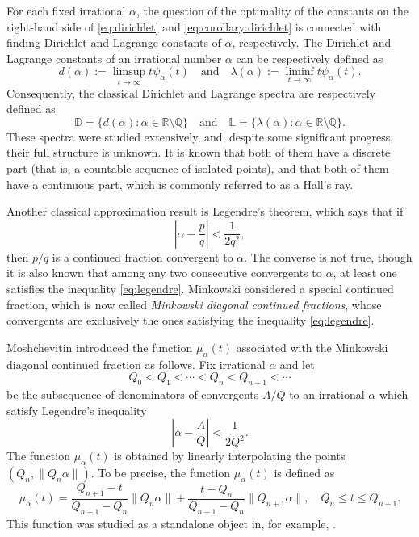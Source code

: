 \documentclass[11pt]{amsart}
\newcommand{\R}{\mathbb R}
\newcommand{\Q}{\mathbb Q}
\begin{document}
For each fixed irrational $\alpha$, the question of the optimality of the constants on the right-hand side of \eqref{eq:dirichlet} and \eqref{eq:corollary:dirichlet} is connected with finding Dirichlet and Lagrange constants of $\alpha$, respectively.  The Dirichlet and Lagrange constants of an irrational number $\alpha$ can be respectively defined as
$$
d(\alpha) := \limsup_{t\to\infty} t\psi_\alpha(t)
\quad \text{and} \quad
\lambda(\alpha) := \liminf_{t\to\infty} t\psi_\alpha(t).
$$
Consequently, the classical Dirichlet and Lagrange spectra are respectively defined as
$$
\mathbb{D}= \{ d(\alpha): \alpha\in\R\setminus\Q\}
\quad
\text{and}
\quad
\mathbb{L}= \{ \lambda(\alpha): \alpha\in\R\setminus\Q\}.
$$
These spectra were studied extensively, and, despite some significant progress, their full structure is unknown. It is known that both of them have a discrete part (that is, a countable sequence of isolated points), and that both of them have a continuous part, which is commonly referred to as a Hall's ray.



Another classical approximation result is Legendre's theorem, which says that if
\begin{equation}\label{eq:legendre}
\left| \alpha - \frac{p}{q} \right| < \frac{1}{2q^2},
\end{equation}
then $p/q$ is a continued fraction convergent to $\alpha$. The converse is not true, though it is also known that among any two consecutive convergents to $\alpha$, at least one satisfies the inequality \eqref{eq:legendre}. Minkowski \cite{MR1511108} considered a special continued fraction, which is now called {\it Minkowski diagonal continued fractions}, whose convergents are exclusively the ones satisfying the inequality \eqref{eq:legendre}.



Moshchevitin introduced the function $\mu_\alpha(t)$ associated with the
Minkowski diagonal continued fraction as follows. Fix irrational $\alpha$ and let 
\begin{equation}\label{sequence:conv}
Q_0<Q_1<\cdots<Q_{n}<Q_{n+1}<\cdots
\end{equation}
be the subsequence of denominators of convergents $A/Q$ to an irrational $\alpha$ which
satisfy Legendre's inequality
\begin{equation}\label{ineq:legendre}
        \left|\alpha-\frac{A}{Q}\right|<\frac{1}{2Q^2}.
\end{equation}
The function $\mu_\alpha(t)$ is obtained by linearly interpolating the points
$(Q_n,\|Q_n\alpha\|)$. To be precise, the function $\mu_\alpha(t)$ is defined as
$$
\mu_\alpha(t) = \frac{Q_{n+1}-t}{Q_{n+1}-Q_n}\|Q_n\alpha\| +\frac{t-Q_n}{Q_{n+1}-Q_n}\|Q_{n+1}\alpha\|, \quad  Q_n\leq t \leq Q_{n+1}.
$$
This function was studied as a standalone object in, for example, \cite{10.1063/1.3630039}.
\end{document}
